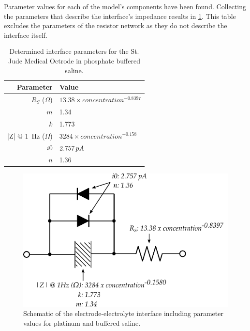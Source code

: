       Parameter values for each of the model's components have been found.
      Collecting the parameters that describe the interface's impedance results in \cref{tab:ModelParameters}.
      This table excludes the parameters of the resistor network as they do not describe the interface itself.

      \begin{table}
        \caption{Determined interface parameters for the St. Jude Medical Octrode in phosphate buffered saline.}
        \label{tab:ModelParameters}
        \begin{center}
          \begin{tabular}{r | l}
              Parameter & Value \\
              \hline

              $R_{S}$ ($\Omega$)& $13.38 \times concentration^{-0.8397}$ \\

              $m$& 1.34\\
              $k$ & 1.773\\
              |Z| @ \SI{1}{\hertz} ($\Omega$)& $3284 \times concentration^{-0.158}$ \\

              $i0$ & $2.757\thinspace pA$\\
              $n$ & 1.36\\
          \end{tabular}
        \end{center}
      \end{table}

      \begin{figure}
        \centering
        \includegraphics{content/pt2/08-InterfaceParameters/graphics/interfaceSchematic_PBS_Solved}
        \caption{\label{fig:interfaceSchematic_PBS_Solved} Schematic of the electrode-electrolyte interface including parameter values for platinum and buffered saline.}
      \end{figure}


